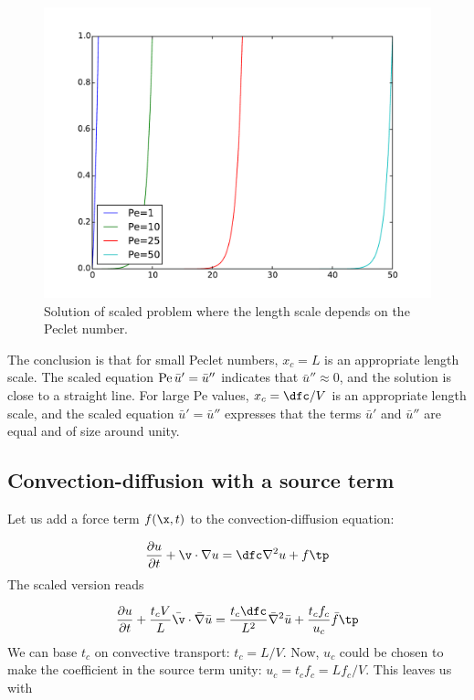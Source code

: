 \documentclass[graybox,envcountchap,sectrefs,final]{svmonodo}
\begin{document}
\begin{figure}[!ht]  %
  \centerline{\includegraphics[width=0.9\linewidth]{fig-scaling/boundary_layer1D_scale2.pdf}}
  \caption{
  Solution of scaled problem where the length scale depends on the Peclet number. \label{scale:convdiff:fig:rescaled}
  }
\end{figure}


The conclusion is that for small Peclet numbers, $x_c=L$ is an
appropriate length scale.
The scaled equation $\hbox{Pe}\,\bar u' = \bar u''$ indicates that $\bar
u''\approx 0$, and the solution is close to a straight line.  For
large Pe values, $x_c=\dfc/V$ is an appropriate length scale, and the
scaled equation $\bar u' = \bar u''$
expresses that the terms $\bar u'$ and $\bar u''$ are
equal and of size around unity.



\subsection{Convection-diffusion with a source term}
\label{scale:convdiff:f}

Let us add a force term $f(\x,t)$ to the convection-diffusion equation:

\begin{equation}
\frac{\partial u}{\partial t} + \v\cdot\nabla u =
\dfc\nabla^2 u + f\tp
\label{scale:convdiff:pde2}
\end{equation}
The scaled version reads

\[
\frac{\partial u}{\partial t} + \frac{t_cV}{L}\bar\v\cdot\bar\nabla \bar u =
\frac{t_c\dfc}{L^2}\bar\nabla^2 \bar u + \frac{t_cf_c}{u_c}\bar f\tp
\]
We can base $t_c$ on convective transport: $t_c = L/V$. Now,
$u_c$ could be chosen to make the coefficient in the source term unity:
$u_c = t_cf_c = Lf_c/V$.
This leaves us with
\end{document}
